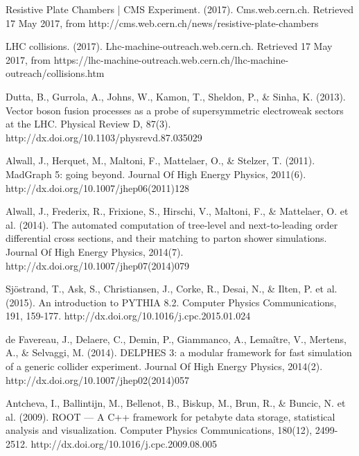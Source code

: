 \documentclass[11pt]{book}
\begin{document}
\begin{thebibliography}{10}
 Resistive Plate Chambers | CMS Experiment. (2017). Cms.web.cern.ch. Retrieved 17 May 2017, from http://cms.web.cern.ch/news/resistive-plate-chambers

 LHC collisions. (2017). Lhc-machine-outreach.web.cern.ch. Retrieved 17 May 2017, from https://lhc-machine-outreach.web.cern.ch/lhc-machine-outreach/collisions.htm

 Dutta, B., Gurrola, A., Johns, W., Kamon, T., Sheldon, P., \& Sinha, K. (2013). Vector boson fusion processes as a probe of supersymmetric electroweak sectors at the LHC. Physical Review D, 87(3). http://dx.doi.org/10.1103/physrevd.87.035029  

 Alwall, J., Herquet, M., Maltoni, F., Mattelaer, O., \& Stelzer, T. (2011).   MadGraph 5: going beyond. Journal Of High Energy Physics, 2011(6). http://dx.doi.org/10.1007/jhep06(2011)128  

 Alwall, J., Frederix, R., Frixione, S., Hirschi, V., Maltoni, F., \& Mattelaer, O. et al. (2014). The automated computation of tree-level and next-to-leading order differential cross sections, and their matching to parton shower simulations. Journal Of High Energy Physics, 2014(7). http://dx.doi.org/10.1007/jhep07(2014)079  

 Sjöstrand, T., Ask, S., Christiansen, J., Corke, R., Desai, N., \& Ilten, P. et al. (2015). An introduction to PYTHIA 8.2. Computer Physics Communications, 191, 159-177. http://dx.doi.org/10.1016/j.cpc.2015.01.024  

 de Favereau, J., Delaere, C., Demin, P., Giammanco, A., Lemaître, V., Mertens, A., \& Selvaggi, M. (2014). DELPHES 3: a modular framework for fast simulation of a generic collider experiment. Journal Of High Energy Physics, 2014(2). http://dx.doi.org/10.1007/jhep02(2014)057  

 Antcheva, I., Ballintijn, M., Bellenot, B., Biskup, M., Brun, R., \& Buncic, N. et al.   (2009). ROOT — A C++ framework for petabyte data storage, statistical analysis and visualization. Computer Physics Communications, 180(12), 2499-2512. http://dx.doi.org/10.1016/j.cpc.2009.08.005   


\end{thebibliography}
\end{document}
